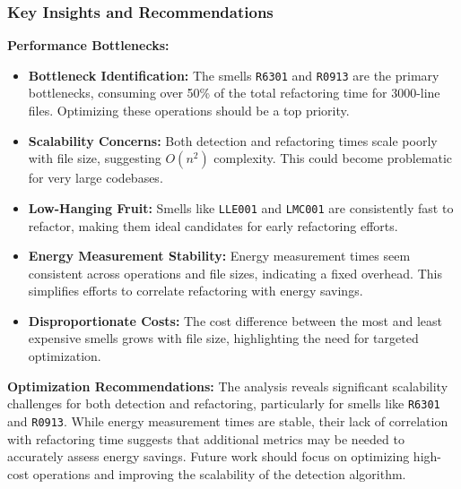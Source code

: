 \documentclass[12pt, titlepage]{article}
\begin{document}
\subsubsection{Key Insights and Recommendations}

\noindent \textbf{Performance Bottlenecks:}
\begin{itemize}
  \item \textbf{Bottleneck Identification:} The smells \texttt{R6301}
    and \texttt{R0913} are the primary bottlenecks, consuming over
    50\% of the total refactoring time for 3000-line files.
    Optimizing these operations should be a top priority.
  \item \textbf{Scalability Concerns:} Both detection and refactoring
    times scale poorly with file size, suggesting \(O(n^2)\)
    complexity. This could become problematic for very large codebases.
  \item \textbf{Low-Hanging Fruit:} Smells like \texttt{LLE001} and
    \texttt{LMC001} are consistently fast to refactor, making them
    ideal candidates for early refactoring efforts.
  \item \textbf{Energy Measurement Stability:} Energy measurement
    times seem consistent across operations and file sizes,
    indicating a fixed overhead. This simplifies efforts to correlate
    refactoring with energy savings.
  \item \textbf{Disproportionate Costs:} The cost difference between
    the most and least expensive smells grows with file size,
    highlighting the need for targeted optimization.
\end{itemize}

\noindent \textbf{Optimization Recommendations:}
The analysis reveals significant scalability challenges for both
detection and refactoring, particularly for smells like
\texttt{R6301} and \texttt{R0913}. While energy measurement times are
stable, their lack of correlation with refactoring time suggests that
additional metrics may be needed to accurately assess energy savings.
Future work should focus on optimizing high-cost operations and
improving the scalability of the detection algorithm.
\end{document}
